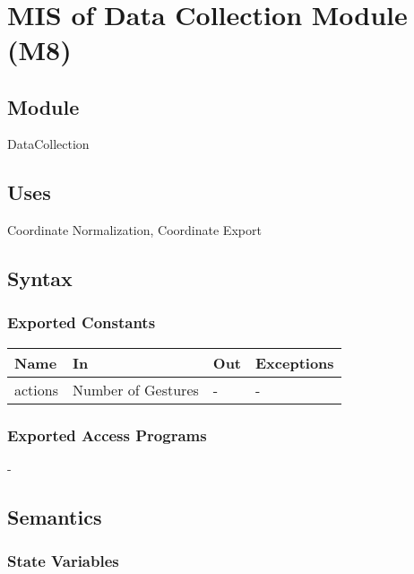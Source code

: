 \documentclass[12pt, titlepage]{article}
\begin{document}
~\newpage

\section{MIS of Data Collection Module (M8)} \label{M8}

\subsection{Module}

DataCollection\\

\subsection{Uses}

Coordinate Normalization, Coordinate Export\\

\subsection{Syntax}

\subsubsection{Exported Constants}

\begin{center}
\begin{tabular}{p{5cm} p{3cm} p{3cm} p{4cm}}
\hline
\textbf{Name} & \textbf{In} & \textbf{Out} & \textbf{Exceptions} \\
\hline
actions & Number of Gestures & - & - \\
\hline
\end{tabular}
\end{center}

\subsubsection{Exported Access Programs}
-

\subsection{Semantics}

\subsubsection{State Variables}
\end{document}
